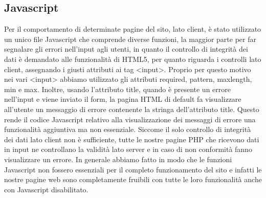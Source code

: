 \documentclass[a4paper]{article}
\begin{document}
	\subsection{Javascript}
	Per il comportamento di determinate pagine del sito, lato client, è stato utilizzato un unico file Javascript che comprende diverse funzioni, la maggior parte per far segnalare gli errori nell'input agli utenti, in quanto il controllo di integrità dei dati è demandato alle funzionalità di HTML5, per quanto riguarda i controlli lato client, assegnando i giusti attributi ai tag <input>. Proprio per questo motivo nei vari <input> abbiamo utilizzato gli attributi required, pattern, maxlength, min e max. Inoltre, usando l'attributo title, quando è presente un errore nell'input e viene inviato il form, la pagina HTML di default fa visualizzare all'utente un messaggio di errore contenente la stringa dell'attributo title. Questo rende il codice Javascript relativo alla visualizzazione dei messaggi di errore una funzionalità aggiuntiva ma non essenziale. Siccome il solo controllo di integrità dei dati lato client non è sufficiente, tutte le nostre pagine PHP che ricevono dati in input ne controllano la validità lato server e in caso di non conformità fanno visualizzare un errore.  In generale abbiamo fatto in modo che le funzioni Javascript non fossero essenziali per il completo funzionamento del sito e  infatti le nostre pagine web sono completamente fruibili con tutte le loro funzionalità anche con Javascript disabilitato.
\end{document}
